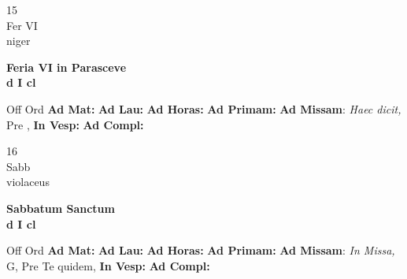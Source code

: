 \documentclass[10pt, openany]{book}
\begin{document}
    \begin{center}
        \begin{minipage}{3.5in}
            \vspace{2em}
            \begin{minipage}{0.5in}
                {\Huge 15} \\
                {\normalsize Fer VI} \\
                {\normalsize niger}
            \end{minipage}
            \begin{minipage}{3.0in}
                \textbf{ \large Feria VI in Parasceve \\
                \textnormal{\normalsize d I cl}} \\ 
            \end{minipage}
            \begin{justify}Off Ord
                \textbf{Ad Mat: }
                \textbf{Ad Lau: }
                \textbf{Ad Horas: }
                \textbf{Ad Primam: }\textbf{Ad Missam}: \textit{Haec dicit,} Pre ,  
                \textbf{In Vesp: }
                \textbf{Ad Compl: }
            \end{justify}
        \end{minipage}
    \end{center}

    \begin{center}
        \begin{minipage}{3.5in}
            \vspace{2em}
            \begin{minipage}{0.5in}
                {\Huge 16} \\
                {\normalsize Sabb} \\
                {\normalsize violaceus}
            \end{minipage}
            \begin{minipage}{3.0in}
                \textbf{ \large Sabbatum Sanctum \\
                \textnormal{\normalsize d I cl}} \\ 
            \end{minipage}
            \begin{justify}Off Ord
                \textbf{Ad Mat: }
                \textbf{Ad Lau: }
                \textbf{Ad Horas: }
                \textbf{Ad Primam: }\textbf{Ad Missam}: \textit{In Missa,} G, Pre Te quidem,  
                \textbf{In Vesp: }
                \textbf{Ad Compl: }
            \end{justify}
        \end{minipage}
    \end{center}
\end{document}
